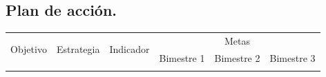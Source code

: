 \subsection{Plan de acción.}
\begin{tabular}{|l|l|l|l|l|l|}\hline
  \multirow{2}{*}{Objetivo} & \multirow{2}{*}{Estrategia} & \multirow{2}{*}{Indicador}  & \multicolumn{3}{|c|}{Metas}\\
\cline{4-6} 
& & & Bimestre 1 &Bimestre 2 & Bimestre 3\\\hline 
&&&&&\\\hline
\end{tabular}



